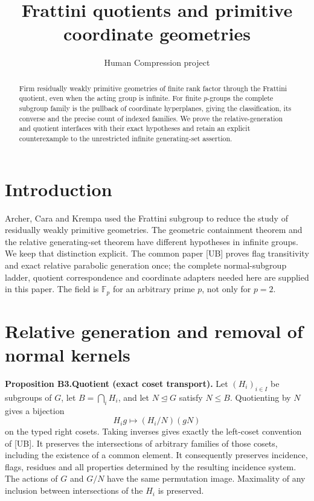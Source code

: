 
\title{Frattini quotients and primitive coordinate geometries}
\author{Human Compression project}
\date{}

\maketitle
\begin{abstract}
Firm residually weakly primitive geometries of finite rank factor through the Frattini quotient, even when the acting group is infinite. For finite $p$-groups the complete subgroup family is the pullback of coordinate hyperplanes, giving the classification, its converse and the precise count of indexed families. We prove the relative-generation and quotient interfaces with their exact hypotheses and retain an explicit counterexample to the unrestricted infinite generating-set assertion.
\end{abstract}
\section{Introduction}
Archer, Cara and Krempa used the Frattini subgroup to reduce the study of residually weakly primitive geometries. The geometric containment theorem and the relative generating-set theorem have different hypotheses in infinite groups. We keep that distinction explicit. The common paper [UB] proves flag transitivity and exact relative parabolic generation once; the complete normal-subgroup ladder, quotient correspondence and coordinate adapters needed here are supplied in this paper. The field is $\mathbb F_p$ for an arbitrary prime $p$, not only for $p=2$.
\section{Relative generation and removal of normal kernels}
\textbf{Proposition B3.Quotient (exact coset transport).} Let \((H_i)_{i\in I}\) be subgroups of \(G\), let \(B=\bigcap_i H_i\), and let \(N\unlhd G\) satisfy \(N\leq B\). Quotienting by \(N\) gives a bijection \begin{equation}
H_i g\longmapsto (H_i/N)(gN)
\label{eq:frattini-coordinate-geometries:1-5}
\end{equation} on the typed right cosets. Taking inverses gives exactly the left-coset convention of [UB]. It preserves the intersections of arbitrary families of those cosets, including the existence of a common element. It consequently preserves incidence, flags, residues and all properties determined by the resulting incidence system. The actions of \(G\) and \(G/N\) have the same permutation image. Maximality of any inclusion between intersections of the \(H_i\) is preserved.

